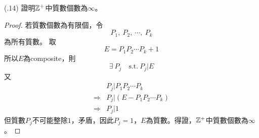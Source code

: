 \item \begin{theorem}{(.14)} 證明$\mathbb{Z}^+$中質數個數為$\infty$。 \\
    \begin{proof}
        若質數個數為有限個，令\begin{equation}
            P_1, \ P_2, \ \cdots, \ P_k
        \end{equation} 為所有質數。
        取\begin{equation}
            E = P_1P_2\cdots P_k + 1
        \end{equation} 所以$E$為composite，則
        \begin{equation}
            \exists \ P_j \quad \text{s.t.} \ P_j | E
        \end{equation} 又
        \begin{equation}
            \begin{aligned}
                & P_j | P_1P_2\cdots P_k  \\
                \Rightarrow & P_j | (E - P_1P_2\cdots P_k) \\
                \Rightarrow & P_j | 1
            \end{aligned} 
        \end{equation} 但質數$P_j$不可能整除$1$，矛盾，因此$P_j = 1$，$E$為質數。得證，$\mathbb{Z}^+$中質數個數為$\infty$。
    \end{proof}
\end{theorem}
